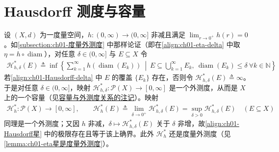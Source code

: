 \documentclass[../../main.tex]{subfiles}%
\begin{document}
\section{Hausdorff 测度与容量}\label{section:ch01-Hausdorff}

设 $(X,d)$ 为一度量空间，$h:(0,\infty)\to(0,\infty]$ 非减且满足 $\lim_{r\to0^+}h(r)=0$。如\cref{subsection:ch01-度量外测度} 中那样论证（即在\eqref{align:ch01-eta-delta} 中取 $\eta=h\circ\operatorname{diam}$），对任意 $\delta\in(0,\infty]$ 与 $E\subseteq X$ 令
\begin{align}
\mathcal{H}_{h,\delta}^*(E)\triangleq \inf\left\{\sum_{k=1}^\infty h(\operatorname{diam}(E_k))\ \middle|\ E\subseteq\bigcup_{k=1}^\infty E_k,\ \operatorname{diam}(E_k)\leqslant\delta\ \forall k\in\mathbb{N}\right\} \label{align:ch01-Hausdorff-delta}
\end{align}
若\eqref{align:ch01-Hausdorff-delta} 中 $E$ 的覆盖 $\{E_k\}$ 存在，否则令 $\mathcal{H}_{h,\delta}^*(E)\triangleq \infty$。于是对任意 $\delta\in(0,\infty]$，映射 $\mathcal{H}_{h,\delta}^*:\mathcal{P}(X)\to[0,\infty]$ 是一个外测度，从而是 $X$ 上的一个容量（见\hyperref[remark:ch01-eta是容量]{容量与外测度关系的注记}）。映射
\begin{align}
\mathcal{H}_h^*:\mathcal{P}(X)\to[0,\infty],\qquad
\mathcal{H}_h^*(E)\triangleq \lim_{\delta\to0^+}\mathcal{H}_{h,\delta}^*(E)=\sup_{\delta>0}\mathcal{H}_{h,\delta}^*(E)\quad(E\subseteq X) \label{align:ch01-Hausdorff星}
\end{align}
同理是一个外测度；又因 $h$ 非减，$\delta\mapsto\mathcal{H}_{h,\delta}^*(E)$ 关于 $\delta$ 非增，故\eqref{align:ch01-Hausdorff星} 中的极限存在且等于该上确界。此外 $\mathcal{H}_h^*$ 还是度量外测度（见\cref{lemma:ch01-eta星是度量外测度}）。
\end{document}
